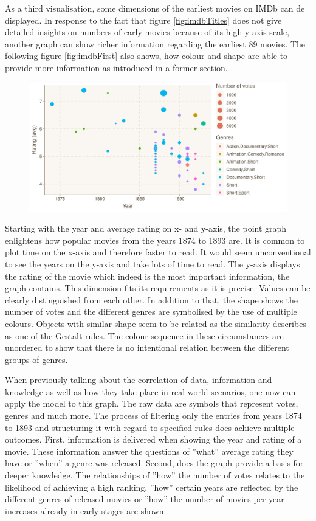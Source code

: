As a third visualisation, some dimensions of the earliest movies on IMDb can de displayed. In response to the fact that figure \ref{fig:imdbTitles} does not give detailed insights on numbers of early movies because of its high y-axis scale, another graph can show richer information regarding the earliest 89 movies. The following figure \ref{fig:imdbFirst} also shows, how colour and shape are able to provide more information as introduced in a former section.\\

\begin{figure}[caption={The earliest movies listed on IMDb}, label={fig:imdbFirst}]
	{\includegraphics[width=14.5cm]{figures/first_movies.pdf}}
\end{figure}

Starting with the year and average rating on x- and y-axis, the point graph enlightens how popular movies from the years 1874 to 1893 are. It is common to plot time on the x-axis and therefore faster to read. It would seem unconventional to see the years on the y-axis and take lots of time to read. The y-axis displays the rating of the movie which indeed is the most important information, the graph contains. This dimension fits its requirements as it is  precise. Values can be clearly distinguished from each other. In addition to that, the shape shows the number of votes and the different genres are symbolised by the use of multiple colours. Objects with similar shape seem to be related as the similarity describes as one of the Gestalt rules. The colour sequence in these circumstances are unordered to show that there is no intentional relation between the different groups of genres. 

When previously talking about the correlation of data, information and knowledge as well as how they take place in real world scenarios, one now can apply the model to this graph. The raw data are symbols that represent votes, genres and much more. The process of filtering only the entries from years 1874 to 1893 and structuring it with regard to specified rules does achieve multiple outcomes. First, information is delivered when showing the year and rating of a movie. These information answer the questions of ''what'' average rating they have or ''when'' a genre was released. Second, does the graph provide a basis for deeper knowledge. The relationships of ''how'' the number of votes relates to the likelihood of achieving a high ranking, ''how'' certain years are reflected by the different genres of released movies or ''how'' the number of movies per year increases already in early stages are shown.

